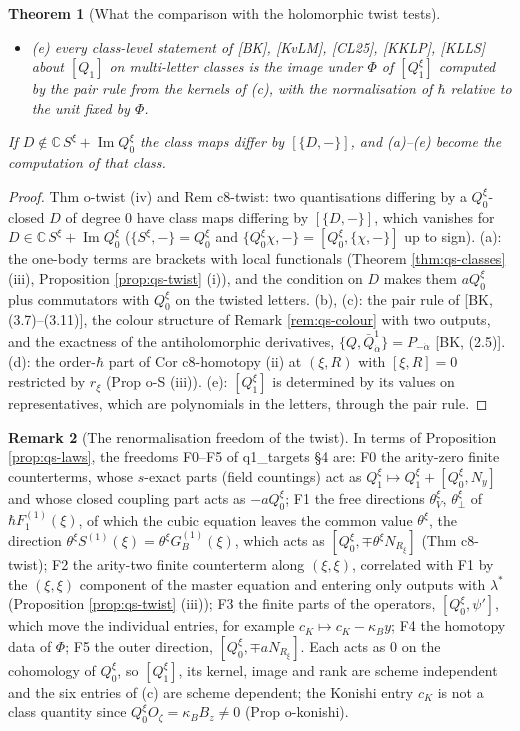 \documentclass[11pt]{article}
\numberwithin{equation}{section}
\theoremstyle{plain}
\newtheorem{theorem}{Theorem}[section]
\theoremstyle{definition}
\newtheorem{remark}[theorem]{Remark}
\begin{document}
\begin{theorem}[What the comparison with the holomorphic twist tests]
\begin{itemize}
\item (e) every class-level statement of [BK], [KvLM], [CL25], [KKLP], [KLLS] about $[Q_1]$ on multi-letter classes is the image under $\Phi$ of $[Q^\xi_1]$ computed by the pair rule from the kernels of (c), with the normalisation of $\hbar$ relative to the unit fixed by $\Phi$.
\end{itemize}
If $D\notin\mathbb C\,S^\xi+\operatorname{Im}Q^\xi_0$ the class maps differ by $[\{D,-\}]$, and (a)--(e) become the computation of that class.
\end{theorem}

\begin{proof}
Thm o-twist (iv) and Rem c8-twist: two quantisations differing by a $Q^\xi_0$-closed $D$ of degree $0$ have class maps differing by $[\{D,-\}]$, which vanishes for $D\in\mathbb C\,S^\xi+\operatorname{Im}Q^\xi_0$ ($\{S^\xi,-\}=Q^\xi_0$ and $\{Q^\xi_0\chi,-\}=[Q^\xi_0,\{\chi,-\}]$ up to sign). (a): the one-body terms are brackets with local functionals (Theorem \ref{thm:qs-classes} (iii), Proposition \ref{prop:qs-twist} (i)), and the condition on $D$ makes them $aQ^\xi_0$ plus commutators with $Q^\xi_0$ on the twisted letters. (b), (c): the pair rule of [BK, (3.7)--(3.11)], the colour structure of Remark \ref{rem:qs-colour} with two outputs, and the exactness of the antiholomorphic derivatives, $\{Q,\bar Q^1_{\dot\alpha}\}=P_{-\dot\alpha}$ [BK, (2.5)]. (d): the order-$\hbar$ part of Cor c8-homotopy (ii) at $(\xi,R)$ with $[\xi,R]=0$ restricted by $r_\xi$ (Prop o-S (iii)). (e): $[Q^\xi_1]$ is determined by its values on representatives, which are polynomials in the letters, through the pair rule.
\end{proof}

\begin{remark}[The renormalisation freedom of the twist]
\label{rem:qs-twistfreedom}
In terms of Proposition \ref{prop:qs-laws}, the freedoms F0--F5 of q1\_targets §4 are: F0 the arity-zero finite counterterms, whose $s$-exact parts (field countings) act as $Q^\xi_1\mapsto Q^\xi_1+[Q^\xi_0,N_y]$ and whose closed coupling part acts as $-aQ^\xi_0$; F1 the free directions $\theta^\xi_V$, $\theta^\xi_\perp$ of $\hbar F_1^{(1)}(\xi)$, of which the cubic equation leaves the common value $\theta^\xi$, the direction $\theta^\xi S^{(1)}(\xi)=\theta^\xi G_B^{(1)}(\xi)$, which acts as $[Q^\xi_0,\mp\theta^\xi N_{R_\xi}]$ (Thm c8-twist); F2 the arity-two finite counterterm along $(\xi,\xi)$, correlated with F1 by the $(\xi,\xi)$ component of the master equation and entering only outputs with $\lambda^*$ (Proposition \ref{prop:qs-twist} (iii)); F3 the finite parts of the operators, $[Q^\xi_0,\psi']$, which move the individual entries, for example $c_K\mapsto c_K-\kappa_By$; F4 the homotopy data of $\Phi$; F5 the outer direction, $[Q^\xi_0,\mp aN_{R_\xi}]$. Each acts as $0$ on the cohomology of $Q^\xi_0$, so $[Q^\xi_1]$, its kernel, image and rank are scheme independent and the six entries of (c) are scheme dependent; the Konishi entry $c_K$ is not a class quantity since $Q^\xi_0O_\zeta=\kappa_BB_z\neq0$ (Prop o-konishi).
\end{remark}
\end{document}
